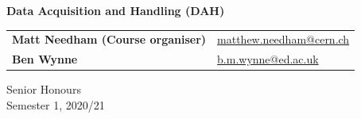 \vspace{1cm}

\begin{center}
\end{center}

\vspace{1cm}

\begin{center}
{\LARGE\bf Data Acquisition and Handling (DAH)}
\end{center}

\begin{center}

\vspace{2cm}

\begin{tabular}{ll}
{\Large{\bf Matt Needham (Course organiser)}} & \href{mailto:matthew.needham@cern.ch}{matthew.needham@cern.ch} \\
{\Large {\bf Ben Wynne} } & \href{mailto:b.m.wynne@ed.ac.uk}{b.m.wynne@ed.ac.uk} \\
\end{tabular}

\vspace{2cm}
{\Large Senior Honours} \\
{\Large Semester 1, 2020/21} \\

\vspace{2cm}


\end{center}

\vspace{2cm}


